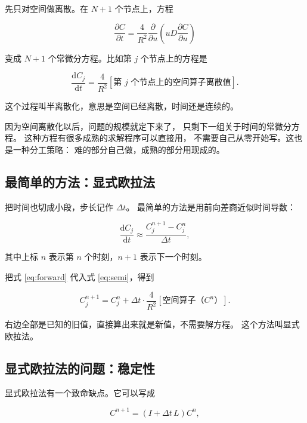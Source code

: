 先只对空间做离散。在 $N+1$ 个节点上，方程

\begin{equation}
\frac{\partial C}{\partial t}=\frac{4}{R^2}\frac{\partial}{\partial u}\left(uD\frac{\partial C}{\partial u}\right)
\end{equation}

变成 $N+1$ 个常微分方程。比如第 $j$ 个节点上的方程是

\begin{equation}
\frac{\mathrm{d}C_j}{\mathrm{d}t}
= \frac{4}{R^2}\left[\text{第 }j\text{ 个节点上的空间算子离散值}\right].
\label{eq:semi}
\end{equation}

这个过程叫半离散化，意思是空间已经离散，时间还是连续的。

因为空间离散化以后，问题的规模就定下来了，
只剩下一组关于时间的常微分方程。
这种方程有很多成熟的求解程序可以直接用，
不需要自己从零开始写。这也是一种分工策略：
难的部分自己做，成熟的部分用现成的。

\subsection{最简单的方法：显式欧拉法}

把时间也切成小段，步长记作 $\Delta t$。
最简单的方法是用前向差商近似时间导数：

\begin{equation}
\frac{\mathrm{d}C_j}{\mathrm{d}t}\approx\frac{C_j^{n+1}-C_j^{n}}{\Delta t},
\label{eq:forward}
\end{equation}

其中上标 $n$ 表示第 $n$ 个时刻，$n+1$ 表示下一个时刻。

把式 \eqref{eq:forward} 代入式 \eqref{eq:semi}，得到

\begin{equation}
C_j^{n+1} = C_j^{n} + \Delta t\cdot
\frac{4}{R^2}\left[\text{空间算子}（C^n）\right].
\label{eq:euler}
\end{equation}

右边全部是已知的旧值，直接算出来就是新值，不需要解方程。
这个方法叫显式欧拉法。

\subsection{显式欧拉法的问题：稳定性}

显式欧拉法有一个致命缺点。它可以写成

\begin{equation}
C^{n+1} = \left(I+\Delta t\,L\right)C^{n},
\end{equation}

